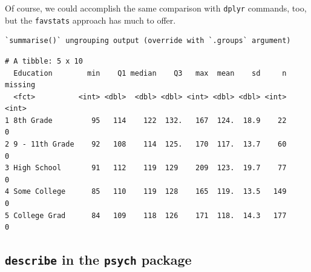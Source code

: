 \documentclass[
]{book}
\newenvironment{Shaded}{\begin{snugshade}}{\end{snugshade}}
\newcommand{\DataTypeTok}[1]{\textcolor[rgb]{0.13,0.29,0.53}{#1}}
\newcommand{\FloatTok}[1]{\textcolor[rgb]{0.00,0.00,0.81}{#1}}
\newcommand{\KeywordTok}[1]{\textcolor[rgb]{0.13,0.29,0.53}{\textbf{#1}}}
\newcommand{\NormalTok}[1]{#1}
\newcommand{\OperatorTok}[1]{\textcolor[rgb]{0.81,0.36,0.00}{\textbf{#1}}}
\newcommand{\StringTok}[1]{\textcolor[rgb]{0.31,0.60,0.02}{#1}}
\begin{document}
Of course, we could accomplish the same comparison with \texttt{dplyr} commands, too, but the \texttt{favstats} approach has much to offer.

\begin{Shaded}
\end{Shaded}

\begin{verbatim}
`summarise()` ungrouping output (override with `.groups` argument)
\end{verbatim}

\begin{verbatim}
# A tibble: 5 x 10
  Education        min    Q1 median    Q3   max  mean    sd     n missing
  <fct>          <int> <dbl>  <dbl> <dbl> <int> <dbl> <dbl> <int>   <int>
1 8th Grade         95   114    122  132.   167  124.  18.9    22       0
2 9 - 11th Grade    92   108    114  125.   170  117.  13.7    60       0
3 High School       91   112    119  129    209  123.  19.7    77       0
4 Some College      85   110    119  128    165  119.  13.5   149       0
5 College Grad      84   109    118  126    171  118.  14.3   177       0
\end{verbatim}

\hypertarget{describe-in-the-psych-package}{%
\subsection{\texorpdfstring{\texttt{describe} in the \texttt{psych} package}{describe in the psych package}}\label{describe-in-the-psych-package}}
\end{document}
